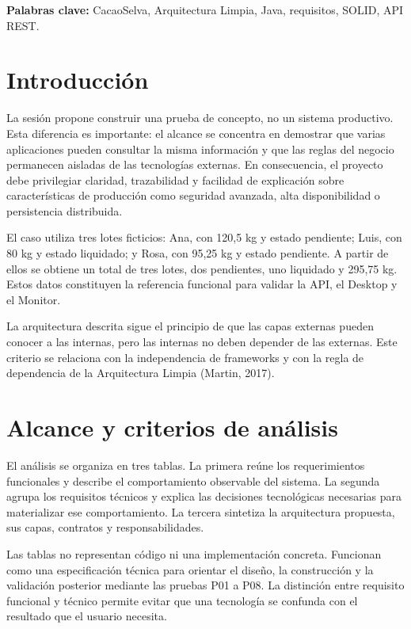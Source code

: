 \documentclass[12pt,letterpaper]{article}
\begin{document}
\textbf{Palabras clave:} CacaoSelva, Arquitectura Limpia, Java, requisitos, SOLID, API REST.

\clearpage
\tableofcontents
\newpage

\section{Introducción}
La sesión propone construir una prueba de concepto, no un sistema productivo. Esta diferencia es importante: el alcance se concentra en demostrar que varias aplicaciones pueden consultar la misma información y que las reglas del negocio permanecen aisladas de las tecnologías externas. En consecuencia, el proyecto debe privilegiar claridad, trazabilidad y facilidad de explicación sobre características de producción como seguridad avanzada, alta disponibilidad o persistencia distribuida.

El caso utiliza tres lotes ficticios: Ana, con 120,5 kg y estado pendiente; Luis, con 80 kg y estado liquidado; y Rosa, con 95,25 kg y estado pendiente. A partir de ellos se obtiene un total de tres lotes, dos pendientes, uno liquidado y 295,75 kg. Estos datos constituyen la referencia funcional para validar la API, el Desktop y el Monitor.

La arquitectura descrita sigue el principio de que las capas externas pueden conocer a las internas, pero las internas no deben depender de las externas. Este criterio se relaciona con la independencia de frameworks y con la regla de dependencia de la Arquitectura Limpia (Martin, 2017).

\section{Alcance y criterios de análisis}
El análisis se organiza en tres tablas. La primera reúne los requerimientos funcionales y describe el comportamiento observable del sistema. La segunda agrupa los requisitos técnicos y explica las decisiones tecnológicas necesarias para materializar ese comportamiento. La tercera sintetiza la arquitectura propuesta, sus capas, contratos y responsabilidades.

Las tablas no representan código ni una implementación concreta. Funcionan como una especificación técnica para orientar el diseño, la construcción y la validación posterior mediante las pruebas P01 a P08. La distinción entre requisito funcional y técnico permite evitar que una tecnología se confunda con el resultado que el usuario necesita.
\end{document}
